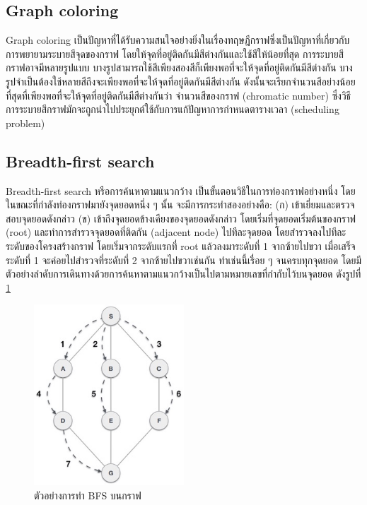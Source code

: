 \subsection{Graph coloring}
 
Graph coloring เป็นปัญหาที่ได้รับความสนใจอย่างยิ่งในเรื่องทฤษฎีกราฟซึ่งเป็นปัญหาที่เกี่ยวกับการพยายามระบายสีจุดของกราฟ โดยให้จุดที่อยู่ติดกันมีสีต่างกันและใช้สีให้น้อยที่สุด
การระบายสีกราฟอาจมีหลายรูปแบบ บางรูปสามารถใช้สีเพียงสองสีก็เพียงพอที่จะให้จุดที่อยู่ติดกันมีสีต่างกัน บางรูปจำเป็นต้องใช้หลายสีถึงจะเพียงพอที่จะให้จุดที่อยู่ติดกันมีสีต่างกัน 
ดังนั้นจะเรียกจำนวนสีอย่างน้อยที่สุดที่เพียงพอที่จะให้จุดที่อยู่ติดกันมีสีต่างกันว่า จำนวนสีของกราฟ (chromatic number) ซึ่งวิธีการระบายสีกราฟมักจะถูกนำไปประยุกต์ใช้กับการแก้ปัญหาการกำหนดตารางเวลา (scheduling problem) 

\subsection{Breadth-first search}
Breadth-first search หรือการค้นหาตามแนวกว้าง เป็นขั้นตอนวิธีในการท่องกราฟอย่างหนึ่ง โดยในขณะที่กำลังท่องกราฟมายังจุดยอดหนึ่ง ๆ นั้น จะมีการกระทำสองอย่างคือ: (ก) เข้าเยี่ยมและตรวจสอบจุดยอดดังกล่าว (ข) เข้าถึงจุดยอดข้างเคียงของจุดยอดดังกล่าว
โดยเริ่มที่จุดยอดเริ่มต้นของกราฟ (root) และทำการสำรวจจุดยอดที่ติดกัน (adjacent node) ไปทีละจุดยอด
โดยสำรวจลงไปทีละระดับของโครงสร้างกราฟ โดยเริ่มจากระดับแรกที่ root แล้วลงมาระดับที่ 1 จากซ้ายไปขวา เมื่อเสร็จระดับที่ 1 จะค่อยไปสำรวจที่ระดับที่ 2 จากซ้ายไปขวาเช่นกัน ทําเช่นนี้เรื่อย ๆ 
จนครบทุกจุดยอด โดยมีตัวอย่างลําดับการเดินทางด้วยการค้นหาตามแนวกว้างเป็นไปตามหมายเลขที่กํากับไว้บนจุดยอด ดังรูปที่ \ref{fig:graph_bfs}
\begin{figure}
  \begin{center}
    \includegraphics[width=0.5\textwidth]{images/breadth_first_traversal.jpg}
  \end{center}
  \caption[ตัวอย่างการทำ BFS บนกราฟ]{ตัวอย่างการทำ BFS บนกราฟ}
  \label{fig:graph_bfs}     
\end{figure}
